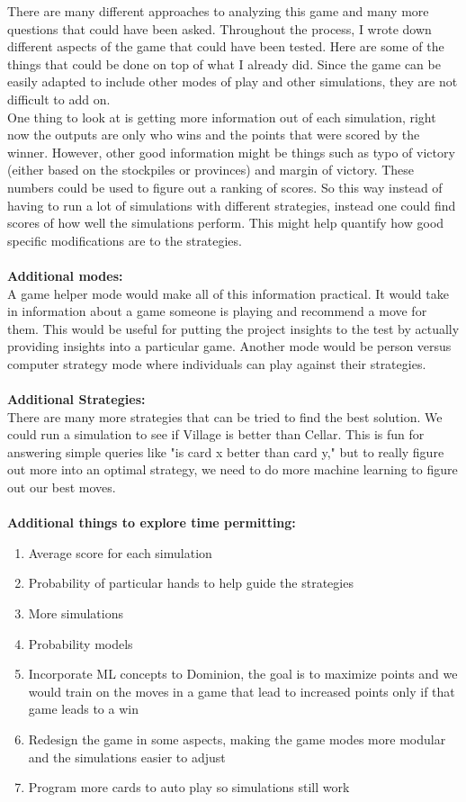 \documentclass[11pt, oneside]{article}   	%
\begin{document}
There are many different approaches to analyzing this game and many more questions that could have been asked. Throughout the process, I wrote down different aspects of the game that could have been tested. Here are some of the things that could be done on top of what I already did. Since the game can be easily adapted to include other modes of play and other simulations, they are not difficult to add on. \\

One thing to look at is getting more information out of each simulation, right now the outputs are only who wins and the points that were scored by the winner. However, other good information might be things such as typo of victory (either based on the stockpiles or provinces) and margin of victory. These numbers could be used to figure out a ranking of scores. So this way instead of having to run a lot of simulations with different strategies, instead one could find scores of how well the simulations perform. This might help quantify how good specific modifications are to the strategies. 
\\
\\
\textbf{Additional modes:}\\
A game helper mode would make all of this information practical. It would take in information about a game someone is playing and recommend a move for them. This would be useful for putting the project insights to the test by actually providing insights into a particular game. Another mode would be person versus computer strategy mode where individuals can play against their strategies. 
\\
\\
\textbf{Additional Strategies:}\\
There are many more strategies that can be tried to find the best solution. We could run a simulation to see if Village is better than Cellar. This is fun for answering simple queries like "is card x better than card y," but to really figure out more into an optimal strategy, we need to do more machine learning to figure out our best moves. 
\\
\\
\textbf{Additional things to explore time permitting:}\\
	\begin{enumerate}
 		 \item Average score for each simulation
		 \item Probability of particular hands to help guide the strategies
		 \item More simulations
		 \item Probability models
		 \item Incorporate ML concepts  to Dominion, the goal is to maximize points and we would train on the moves in a game that lead to increased points only if that game leads to a win
		 \item Redesign the game in some aspects, making the game modes more modular and the simulations easier to adjust
		 \item Program more cards to auto play so simulations still work
	\end{enumerate}
	
\end{document}
